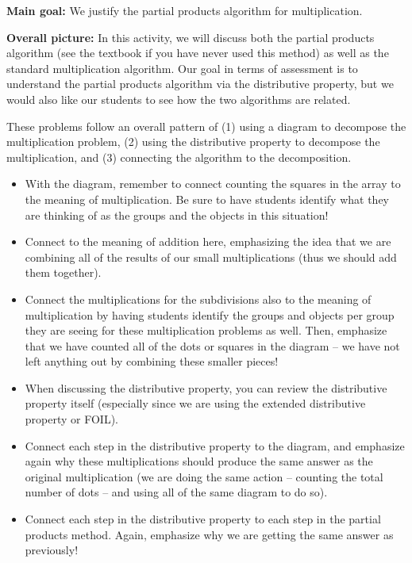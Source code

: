 \documentclass[nooutcomes,noauthor,handout]{ximera}
\begin{document}
\begin{instructorNotes} 



{\bf Main goal:} We justify the partial products algorithm for multiplication.


{\bf Overall picture:} In this activity, we will discuss both the partial products algorithm (see the textbook if you have never used this method) as well as the standard multiplication algorithm. Our goal in terms of assessment is to understand the partial products algorithm via the distributive property, but we would also like our students to see how the two algorithms are related.


These problems follow an overall pattern of (1) using a diagram to decompose the multiplication problem, (2) using the distributive property to decompose the multiplication, and (3) connecting the algorithm to the decomposition. 
\begin{itemize}
	\item With the diagram, remember to connect counting the squares in the array to the meaning of multiplication. Be sure to have students identify what they are thinking of as the groups and the objects in this situation!
	\item Connect to the meaning of addition here, emphasizing the idea that we are combining all of the results of our small multiplications (thus we should add them together).
	\item Connect the multiplications for the subdivisions also to the meaning of multiplication by having students identify the groups and objects per group they are seeing for these multiplication problems as well. Then, emphasize that we have counted all of the dots or squares in the diagram -- we have not left anything out by combining these smaller pieces!
	\item When discussing the distributive property, you can review the distributive property itself (especially since we are using the extended distributive property or FOIL).
	\item Connect each step in the distributive property to the diagram, and emphasize again why these multiplications should produce the same answer as the original multiplication (we are doing the same action -- counting the total number of dots -- and using all of the same diagram to do so).
	\item Connect each step in the distributive property to each step in the partial products method. Again, emphasize why we are getting the same answer as previously!

\end{itemize}
\end{instructorNotes}
\end{document}
